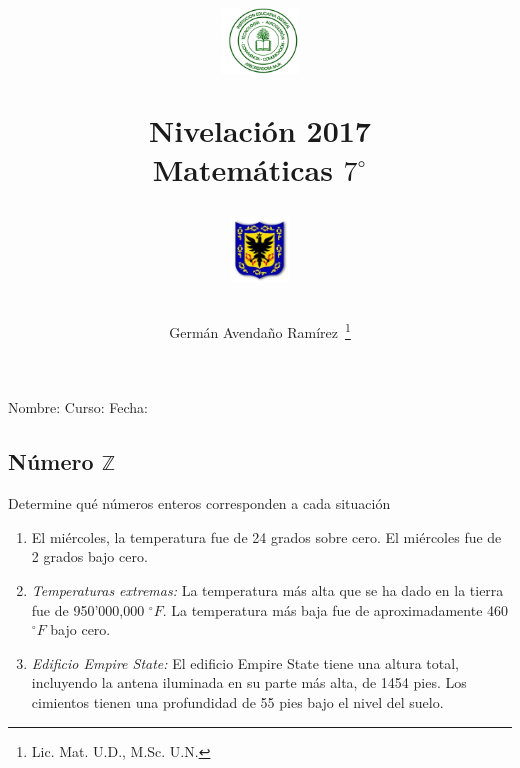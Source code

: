 \documentclass[twoside,letterpaper]{article}
\author{Germ\'an Avenda\~no Ram\'irez~\thanks{Lic. Mat. U.D., M.Sc. U.N.}}
\title{\begin{minipage}{.2\textwidth}
\includegraphics[height=1.75cm]{Images/logo-colegio.png}\end{minipage}
\begin{minipage}{.55\textwidth}
\begin{center}
Nivelación 2017\\
Matemáticas $7^{\circ}$
\end{center}
\end{minipage}\hfill
\begin{minipage}{.2\textwidth}
\includegraphics[height=1.75cm]{Images/logo-sed.png} 
\end{minipage}}
\date{}
\begin{document}
\maketitle
Nombre: \hrulefill Curso: \underline{\hspace*{44pt}} Fecha: \underline{\hspace*{2.5cm}}
\begin{multicols}{2}
\section*{Número $\mathbb{Z}$}
Determine qué números enteros corresponden a cada situación
\begin{enumerate}
\item El miércoles, la temperatura fue de 24 grados sobre cero. El miércoles fue de 2 grados bajo cero.
\item \emph{Temperaturas extremas:} La temperatura más alta que se ha dado en la tierra fue de 950'000,000 $^{\circ}F$. La temperatura más baja fue de aproximadamente 460 $^{\circ}F$ bajo cero.
\item \emph{Edificio Empire State:} El edificio Empire State tiene una altura total, incluyendo la antena iluminada en su parte más alta, de 1454 pies. Los cimientos tienen una profundidad de 55 pies bajo el nivel del suelo.


\end{enumerate}
\end{multicols}
\end{document}
